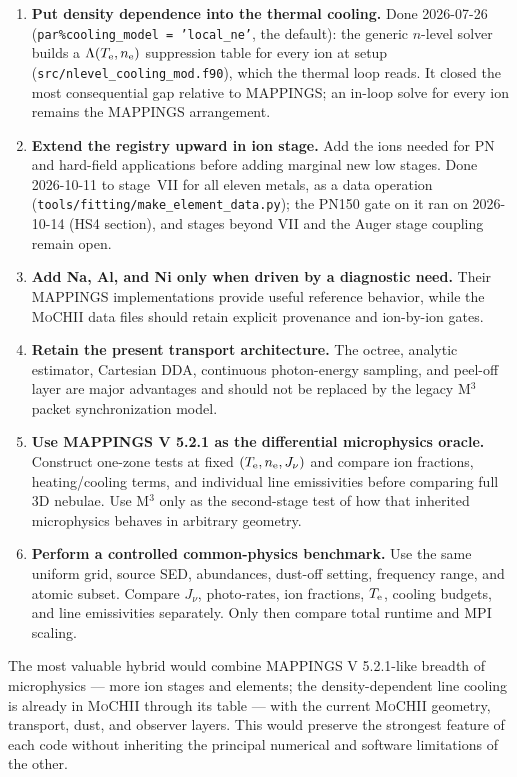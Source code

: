 \documentclass[english,a4paper]{my_memo}
\newcommand{\code}[1]{\texttt{#1}}
\newcommand{\MoCHII}{\textsc{MoCHII}}
\newcommand{\Mthree}{M$^3$}
\newcommand{\Mappings}{MAPPINGS V 5.2.1}
\newcommand{\Te}{T_{\rm e}}
\newcommand{\nelec}{n_{\rm e}}
\begin{document}
\begin{enumerate}[leftmargin=2em]
\item \textbf{Put density dependence into the thermal cooling.}  Done
  2026-07-26 (\code{par\%cooling\_model = 'local\_ne'}, the default): the
  generic $n$-level solver builds a $\Lambda(\Te,\nelec)$ suppression table
  for every ion at setup (\code{src/\allowbreak nlevel\_cooling\_mod.f90}), which the
  thermal loop reads.  It closed the most consequential gap relative to
  MAPPINGS; an in-loop solve for every ion remains the MAPPINGS
  arrangement.
\item \textbf{Extend the registry upward in ion stage.}  Add the ions needed
  for PN and hard-field applications before adding marginal new low stages.
  Done 2026-10-11 to stage~VII for all eleven metals, as a data operation
  (\code{tools/fitting/make\_element\_data.py}); the PN150 gate on it ran
  on 2026-10-14 (HS4 section), and stages beyond VII and the Auger stage
  coupling remain open.
\item \textbf{Add Na, Al, and Ni only when driven by a diagnostic need.}
  Their MAPPINGS implementations provide useful reference behavior, while
  the \MoCHII{} data files should retain explicit provenance and ion-by-ion
  gates.
\item \textbf{Retain the present transport architecture.}  The octree,
  analytic estimator, Cartesian DDA, continuous photon-energy sampling, and
  peel-off layer are major advantages and should not be replaced by the legacy
  \Mthree{} packet synchronization model.
\item \textbf{Use \Mappings{} as the differential microphysics oracle.}
  Construct one-zone tests at fixed $(\Te,\nelec,J_\nu)$ and compare ion
  fractions, heating/cooling terms, and individual line emissivities before
  comparing full 3D nebulae.  Use \Mthree{} only as the second-stage test
  of how that inherited microphysics behaves in arbitrary geometry.
\item \textbf{Perform a controlled common-physics benchmark.}  Use the same
  uniform grid, source SED, abundances, dust-off setting, frequency range,
  and atomic subset.  Compare $J_\nu$, photo-rates, ion fractions, $\Te$,
  cooling budgets, and line emissivities separately.  Only then compare
  total runtime and MPI scaling.
\end{enumerate}

The most valuable hybrid would combine \Mappings{}-like breadth of
microphysics --- more ion stages and elements; the density-dependent line
cooling is already in \MoCHII{} through its table --- with the current
\MoCHII{} geometry, transport, dust, and observer layers.  This would preserve the strongest feature of each code
without inheriting the principal numerical and software limitations of the
other.
\end{document}
